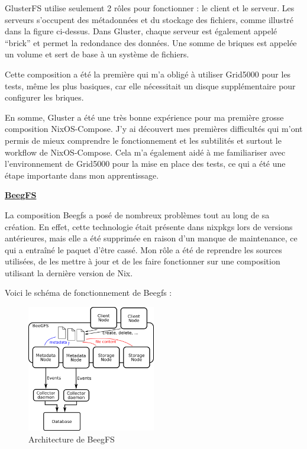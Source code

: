 \documentclass[a4paper,french,12pt, titlepage]{article}
\begin{document}
GlusterFS utilise seulement 2 rôles pour fonctionner : le client et le
serveur. Les serveurs s'occupent des métadonnées et du stockage des
fichiers, comme illustré dans la figure ci-dessus. Dans Gluster, chaque
serveur est également appelé ``brick'' et permet la redondance des
données. Une somme de briques est appelée un volume et sert de base à un
système de fichiers.\newline

Cette composition a été la première qui m'a obligé à utiliser Grid5000
pour les tests, même les plus basiques, car elle nécessitait un disque
supplémentaire pour configurer les briques.\newline

En somme, Gluster a été une très bonne expérience pour ma première
grosse composition NixOS-Compose. J'y ai découvert mes premières
difficultés qui m'ont permis de mieux comprendre le fonctionnement et
les subtilités et surtout le workflow de NixOS-Compose. Cela m'a
également aidé à me familiariser avec l'environnement de Grid5000 pour
la mise en place des tests, ce qui a été une étape importante dans mon
apprentissage.\newline

\textbf{\href{https://www.beegfs.io/c/}{BeegFS}}

La composition Beegfs a posé de nombreux problèmes tout au long de sa
création. En effet, cette technologie était présente dans nixpkgs lors
de versions antérieures, mais elle a été supprimée en raison d'un manque
de maintenance, ce qui a entraîné le paquet d'être cassé. Mon rôle a été
de reprendre les sources utilisées, de les mettre à jour et de les faire
fonctionner sur une composition utilisant la dernière version de
Nix.\newline

Voici le schéma de fonctionnement de Beegfs :

\begin{figure}[h]
\centering
\includegraphics[width=0.5\textwidth,height=0.5\textheight,keepaspectratio]{images/shema-beegfs.png}
\caption{Architecture de BeegFS}
\end{figure}
\end{document}
